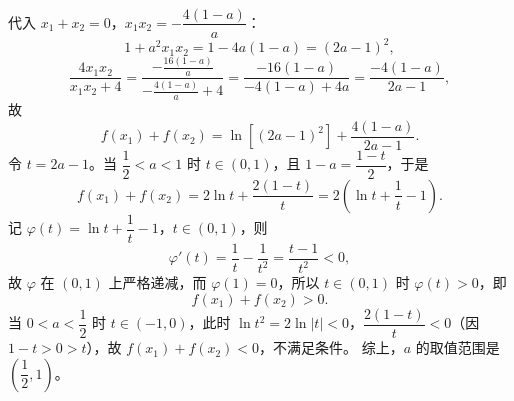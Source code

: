 \begin{answer}
\[\begin{aligned}
\end{aligned}\]
代入 $x_1+x_2=0$，$x_1x_2=-\dfrac{4(1-a)}a$：
\nopagebreak[4]
\[1+a^2x_1x_2=1-4a(1-a)=(2a-1)^2,\]
\nopagebreak[4]
\[\frac{4x_1x_2}{x_1x_2+4}=\frac{-\frac{16(1-a)}a}{-\frac{4(1-a)}a+4}
=\frac{-16(1-a)}{-4(1-a)+4a}=\frac{-4(1-a)}{2a-1},\]
故
\nopagebreak[4]
\[f(x_1)+f(x_2)=\ln\left[(2a-1)^2\right]+\frac{4(1-a)}{2a-1} .\]
令 $t=2a-1$。当 $\dfrac12<a<1$ 时 $t\in(0,1)$，且 $1-a=\dfrac{1-t}2$，于是
\nopagebreak[4]
\[f(x_1)+f(x_2)=2\ln t+\frac{2(1-t)}t=2\left(\ln t+\frac1t-1\right).\]
记 $\varphi(t)=\ln t+\dfrac1t-1$，$t\in(0,1)$，则
\nopagebreak[4]
\[\varphi'(t)=\frac1t-\frac1{t^2}=\frac{t-1}{t^2}<0,\]
故 $\varphi$ 在 $(0,1)$ 上严格递减，而 $\varphi(1)=0$，所以 $t\in(0,1)$ 时 $\varphi(t)>0$，即
\nopagebreak[4]
\[f(x_1)+f(x_2)>0 .\]
当 $0<a<\dfrac12$ 时 $t\in(-1,0)$，此时 $\ln t^2=2\ln|t|<0$，$\dfrac{2(1-t)}t<0$（因 $1-t>0>t$），故 $f(x_1)+f(x_2)<0$，不满足条件。
综上，$a$ 的取值范围是 $\left(\dfrac12,1\right)$。



\end{answer}
